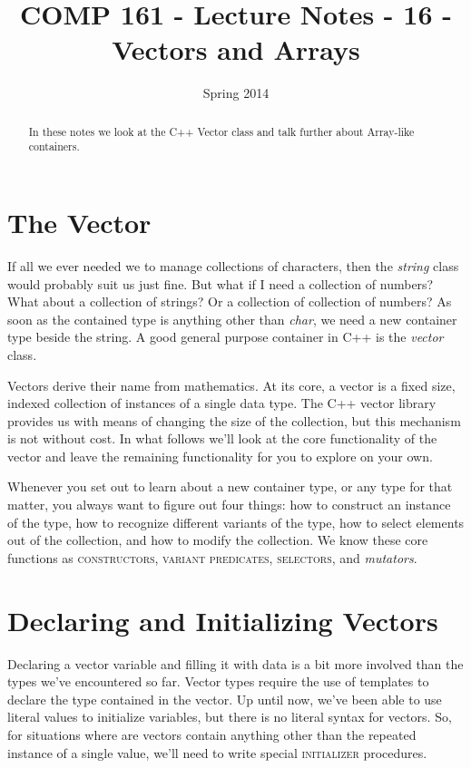 \documentclass[]{tufte-handout}
\title{COMP 161 - Lecture Notes - 16 - Vectors and Arrays}
\date{Spring 2014}
\begin{document}
 
\maketitle

\begin{abstract}
In these notes we look at the C++ Vector class and talk further about Array-like containers.
\end{abstract}

\section{The Vector}

If all we ever needed we to manage collections of characters, then the \textit{string} class would probably suit us just fine.  But what if I need a collection of numbers? What about a collection of strings? Or a collection of collection of numbers?  As soon as the contained type is anything other than \textit{char}, we need a new container type beside the string. A good general purpose container in C++ is the \textit{vector} class.

Vectors derive their name from mathematics.  At its core, a vector is a fixed size, indexed collection of instances of a single data type.  The C++ vector library provides us with means of changing the size of the collection, but this mechanism is not without cost. In what follows we'll look at the core functionality of the vector and leave the remaining functionality for you to explore on your own.  

Whenever you set out to learn about a new container type, or any type for that matter, you always want to figure out four things: how to construct an instance of the type, how to recognize different variants of the type, how to select elements out of the collection, and how to modify the collection.  We know these core functions as \textsc{constructors}, \textsc{variant predicates}, \textsc{selectors}, and \textit{mutators}.

\section{Declaring and Initializing Vectors}

Declaring a vector variable and filling it with data is a bit more involved than the types we've encountered so far.  Vector types require the use of templates to declare the type contained in the vector. Up until now, we've been able to use literal values to initialize variables, but there is no literal syntax for vectors.  So, for situations where are vectors contain anything other than the repeated instance of a single value, we'll need to write special \textsc{initializer} procedures.  
\end{document}
